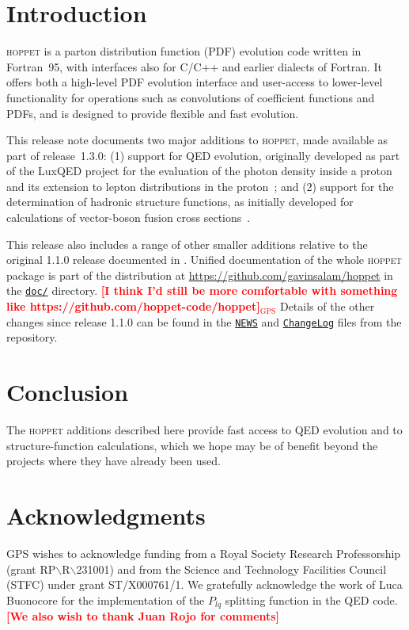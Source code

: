 \documentclass[preprint,1p,a4paper,11pt]{elsarticle}
\newcommand{\hoppet}{\textsc{hoppet}\xspace}
\newcommand{\ttt}[1]{\texttt{#1}}
\newcommand{\repolink}[2]{\href{https://github.com/gavinsalam/hoppet/blob/2023-10-pre1.3.0/#1}{\ttt{#2}}}
\newcommand{\masterlink}[1]{\repolink{#1}{#1}}
\newcommand{\comment}[1]{\textcolor{red}{{\bf [#1]}}}
\newcommand{\gps}[1]{{\textcolor{red}{\comment{#1}$_\text{GPS}$}}}
\begin{document}
\section{Introduction}

\hoppet is a parton distribution function (PDF) evolution code written
in Fortran~95, with interfaces also for C/C++ and earlier dialects of
Fortran.
%
It offers both a high-level PDF evolution interface and user-access to
lower-level functionality for operations such as convolutions of
coefficient functions and PDFs, and is designed to provide flexible and
fast evolution.

This release note documents two major additions to \hoppet, made
available as part of release~1.3.0: (1) support for QED evolution,
originally developed as part of the LuxQED project for the evaluation
of the photon density inside a proton and its extension to lepton
distributions in the
proton~\cite{Manohar:2016nzj,Manohar:2017eqh,Buonocore:2020nai,Buonocore:2021bsf};
%
and (2) support for the
determination of hadronic structure functions, as initially developed
for calculations of vector-boson fusion cross
sections~\cite{Cacciari:2015jma,Dreyer:2016oyx,Dreyer:2018qbw,Dreyer:2018rfu}.

This release also includes a range of other smaller additions relative
to the original 1.1.0 release documented in
\cite{Salam:2008qg}.
%
Unified documentation of the whole \hoppet package is part of the
distribution at \url{https://github.com/gavinsalam/hoppet} in the
\masterlink{doc/} directory. \gps{I think I'd still be more
  comfortable with something like https://github.com/hoppet-code/hoppet}
%
Details of the other changes since release 1.1.0 can be found in the
\masterlink{NEWS} and \masterlink{ChangeLog} files from the
repository.





\section{Conclusion}

The \hoppet additions described here provide fast access to QED
evolution and to structure-function calculations, which we hope may be
of benefit beyond the projects where they have already been used.


\section*{Acknowledgments}

GPS wishes to acknowledge funding from a Royal Society Research
Professorship (grant RP$\backslash$R$\backslash$231001) and from the Science and
Technology Facilities Council (STFC) under grant ST/X000761/1.
%
We gratefully acknowledge the work of Luca Buonocore
for the implementation of the $P_{lq}$ splitting function in the QED code.
% 
\comment{We also wish to thank Juan Rojo for comments}



%
\end{document}
